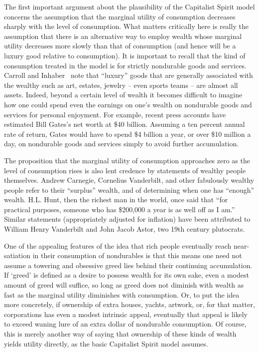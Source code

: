 \documentclass[titlepage,12pt]{article}
\begin{document}
The first important argument about the plausibility of the Capitalist 
Spirit model concerns the assumption that the marginal utility of 
consumption decreases sharply with the level of consumption.  What 
matters critically here is really the assumption that there is an 
alternative way to employ wealth whose marginal utility decreases more 
slowly than that of consumption (and hence will be a luxury good 
relative to consumption).  It is important to recall that the kind of 
consumption treated in the model is for strictly nondurable goods and 
services.  Carroll and Inhaber~\citeyear{scarrollHowRich} note that 
``luxury'' goods that are generally associated with the wealthy such 
as art, estates, jewelry -- even sports teams -- are almost all 
assets.  Indeed, beyond a certain level of wealth it becomes difficult 
to imagine how one could spend even the earnings on one's wealth on 
nondurable goods and services for personal enjoyment.  For example, 
recent press accounts have estimated Bill Gates's net worth at \$40 
billion.  Assuming a ten percent annual rate of return, Gates would 
have to spend \$4 billion a year, or over \$10 million a day, on 
nondurable goods and services simply to avoid further accumulation.

The proposition that the marginal utility of consumption approaches 
zero as the level of consumption rises is also lent credence by 
statements of wealthy people themselves.  Andrew Carnegie, Cornelius 
Vanderbilt, and other fabulously wealthy people refer to their 
``surplus'' wealth, and of determining when one has ``enough'' wealth.  
H.L. Hunt, then the richest man in the world, once said that ``for 
practical purposes, someone who has \$200,000 a year is as well off as 
I am.''  Similar statements (appropriately adjusted for inflation) 
have been attributed to William Henry Vanderbilt and John Jacob Astor, 
two 19th century plutocrats.

One of the appealing features of the idea that rich people eventually 
reach near-satiation in their consumption of nondurables is that this 
means one need not assume a towering and obsessive greed lies behind 
their continuing accumulation.  If `greed' is defined as a desire to 
possess wealth for its own sake, even a modest amount of greed will 
suffice, so long as greed does not diminish with wealth as fast as the 
marginal utility diminishes with consumption.  Or, to put the idea 
more concretely, if ownership of extra houses, yachts, artwork, or, 
for that matter, corporations has even a modest intrinsic appeal, 
eventually that appeal is likely to exceed waning lure of an extra 
dollar of nondurable consumption.  Of course, this is merely another 
way of saying that ownership of these kinds of wealth yields utility 
directly, as the basic Capitalist Spirit model assumes.
\end{document}
